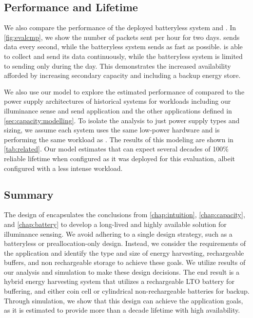 \subsection{\name Performance and Lifetime}
\label{sec:eval:permamote}
We also compare the performance of the
deployed batteryless system and \name. In \cref{fig:evalcmp}, we show the
number of packets sent per hour for two days. \name sends data every
second, while the batteryless system sends as fast as possible. \name is
able to collect and send its data continuously, while the
batteryless system is limited to sending only during the day. This
demonstrates the increased availability afforded by increasing secondary
capacity and including a backup energy store.

We also use our model to explore the estimated performance of \name
compared to the power supply architectures of historical systems for workloads including our illuminance sense and send application and the other applications defined in \cref{sec:capacity:modelling}.
To isolate the analysis to just power supply types and sizing, we assume each
system uses the same low-power hardware and is performing the same workload as \name.
The results of this modeling are shown in \cref{tab:related}. Our model estimates that
\name can expect several decades of 100\% reliable lifetime when configured as
it was deployed for this evaluation, albeit configured with a less intense workload.


\subsection{Summary}
The design of \name encapsulates the conclusions from \cref{chap:intuition}, \cref{chap:capacity}, and \cref{chap:battery} to develop a long-lived and highly available solution for illuminance sensing.
We avoid adhering to a single design strategy, such as a batteryless or preallocation-only design.
Instead, we consider the requirements of the application and identify the type and size of energy harvesting, rechargeable buffers, and non rechargeable storage to achieve these goals.
We utilize results of our analysis and simulation to make these design decisions.
The end result is a hybrid energy harvesting system that utilizes a rechargeable LTO battery for buffering, and either coin cell or cylindrical non-rechargeable batteries for backup.
Through simulation, we show that this design can achieve the application goals, as it is estimated to provide more than a decade lifetime with high availability.

